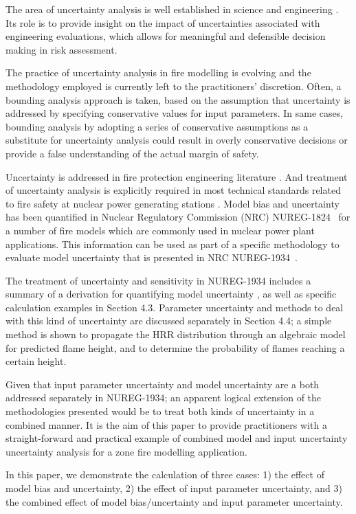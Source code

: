 
The area of uncertainty analysis is well established in science and engineering \cite{Morgan}.  Its role is to provide insight on the impact of uncertainties associated with engineering evaluations, which allows for meaningful and defensible decision making in risk assessment.

The practice of uncertainty analysis in fire modelling is evolving and the methodology employed is currently left to the practitioners' discretion. Often, a bounding analysis approach is taken, based on the assumption that uncertainty is addressed by specifying conservative values for input parameters. In same cases, bounding analysis by adopting a series of conservative assumptions as a substitute for uncertainty analysis could result in overly conservative decisions or provide a false understanding of the actual margin of safety. 

Uncertainty is addressed in fire protection engineering literature \cite{Notarianni:SFPE}.  And treatment of uncertainty analysis is explicitly required in most technical standards related to fire safety at nuclear power generating stations \cite{NFPA:805, NUREG:6850}.  Model bias and uncertainty has been quantified in Nuclear Regulatory Commission (NRC) NUREG-1824~\cite{NUREG_1824_Sup_1} for a number of fire models which are commonly used in nuclear power plant applications. This information can be used as part of a specific methodology to evaluate model uncertainty  that is presented in NRC NUREG-1934~\cite{NUREG_1934}. 

The treatment of  uncertainty and sensitivity in NUREG-1934 includes a summary of a derivation for quantifying model uncertainty \cite{McGrattan2011a}, as well as specific calculation examples in Section 4.3. Parameter uncertainty and methods to deal with this kind of uncertainty are discussed separately in Section 4.4; a simple method is shown to propagate the HRR distribution through an algebraic model for predicted flame height, and to determine the probability of flames reaching a certain height.

Given that input parameter uncertainty and model uncertainty are a both addressed separately in NUREG-1934; an apparent logical extension of the methodologies presented would be to treat both kinds of uncertainty in a combined manner.  It is the aim of this paper to provide practitioners with a straight-forward and practical example of combined model and input uncertainty uncertainty analysis for a zone fire modelling application. 

In this paper, we demonstrate the calculation of three cases: 1) the effect of model bias and uncertainty, 2) the effect of input parameter uncertainty, and 3) the combined effect of model bias/uncertainty and input parameter uncertainty. 

